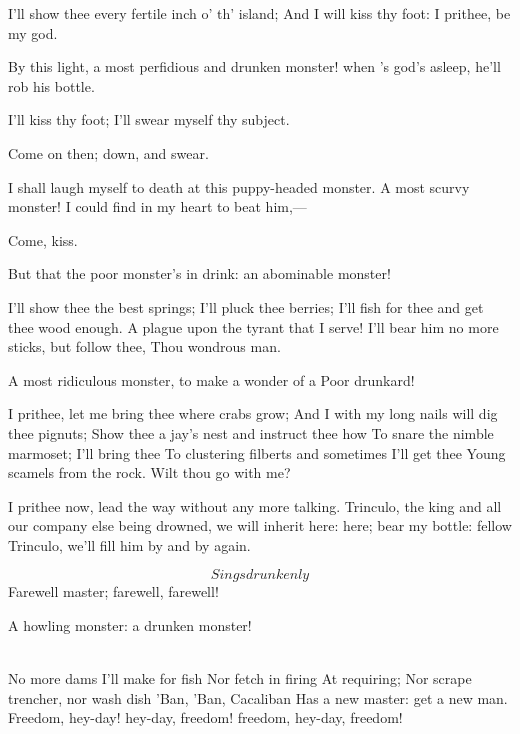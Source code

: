 \documentclass[11pt]{book}
\begin{document}
\begin{PROSE}
\5	I'll show thee every fertile inch o' th' island;
	And I will kiss thy foot: I prithee, be my god.

	By this light, a most perfidious and drunken
	monster! when 's god's asleep, he'll rob his bottle.

\5	I'll kiss thy foot; I'll swear myself thy subject.

	Come on then; down, and swear.

  I shall laugh myself to death at this puppy-headed
	monster. A most scurvy monster! I could find in my
	heart to beat him,---

	Come, kiss.

	But that the poor monster's in drink: an abominable monster!

\end{PROSE}

\5	I'll show thee the best springs; I'll pluck thee berries;
	I'll fish for thee and get thee wood enough.
	A plague upon the tyrant that I serve!
	I'll bear him no more sticks, but follow thee,
	Thou wondrous man.

\begin{PROSE}

	A most ridiculous monster, to make a wonder of a
	Poor drunkard!


\5	I prithee, let me bring thee where crabs grow;
	And I with my long nails will dig thee pignuts;
	Show thee a jay's nest and instruct thee how
	To snare the nimble marmoset; I'll bring thee
	To clustering filberts and sometimes I'll get thee
	Young scamels from the rock. Wilt thou go with me?

	I prithee now, lead the way without any more
	talking. Trinculo, the king and all our company
	else being drowned, we will inherit here: here;
	bear my bottle: fellow Trinculo, we'll fill him by
	and by again.


\5	\[Sings drunkenly\]
	Farewell master; farewell, farewell!

	A howling monster: a drunken monster!

\end{PROSE}

{\Locus \personae {}
\5 \\
   \Locus \textus {+6em}
   \Forma {}
   No more dams I'll make for fish
	Nor fetch in firing
	At requiring;
	Nor scrape trencher, nor wash dish
	'Ban, 'Ban, Cacaliban
	Has a new master: get a new man.
}
	Freedom, hey-day! hey-day, freedom! freedom,
	hey-day, freedom!
\end{document}
